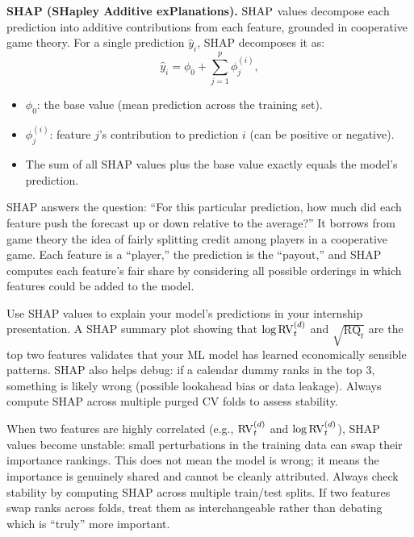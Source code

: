 \textbf{SHAP (SHapley Additive exPlanations).}
$\operatorname{SHAP}$ values decompose each prediction into additive contributions from each feature, grounded in cooperative game theory.
For a single prediction $\hat{y}_i$, SHAP decomposes it as:
\begin{equation}\label{eq:shap}
\hat{y}_i = \phi_0 + \sum_{j=1}^{p} \phi_j^{(i)},
\end{equation}
\begin{itemize}[nosep]
  \item $\phi_0$: the base value (mean prediction across the training set).
  \item $\phi_j^{(i)}$: feature $j$'s contribution to prediction $i$ (can be positive or negative).
  \item The sum of all SHAP values plus the base value exactly equals the model's prediction.
\end{itemize}

\begin{intuition}
SHAP answers the question: ``For this particular prediction, how much did each feature push the forecast up or down relative to the average?'' It borrows from game theory the idea of fairly splitting credit among players in a cooperative game. Each feature is a ``player,'' the prediction is the ``payout,'' and SHAP computes each feature's fair share by considering all possible orderings in which features could be added to the model.
\end{intuition}

\begin{projectconnection}
Use SHAP values to explain your model's predictions in your internship presentation. A SHAP summary plot showing that $\log \operatorname{RV}_t^{(d)}$ and $\sqrt{\operatorname{RQ}_t}$ are the top two features validates that your ML model has learned economically sensible patterns. SHAP also helps debug: if a calendar dummy ranks in the top 3, something is likely wrong (possible lookahead bias or data leakage). Always compute SHAP across multiple purged CV folds to assess stability.
\end{projectconnection}

\begin{warning}
When two features are highly correlated (e.g., $\operatorname{RV}_t^{(d)}$ and $\log \operatorname{RV}_t^{(d)}$), SHAP values become unstable: small perturbations in the training data can swap their importance rankings.
This does not mean the model is wrong; it means the importance is genuinely shared and cannot be cleanly attributed.
Always check stability by computing SHAP across multiple train/test splits.
If two features swap ranks across folds, treat them as interchangeable rather than debating which is ``truly'' more important.
\end{warning}

